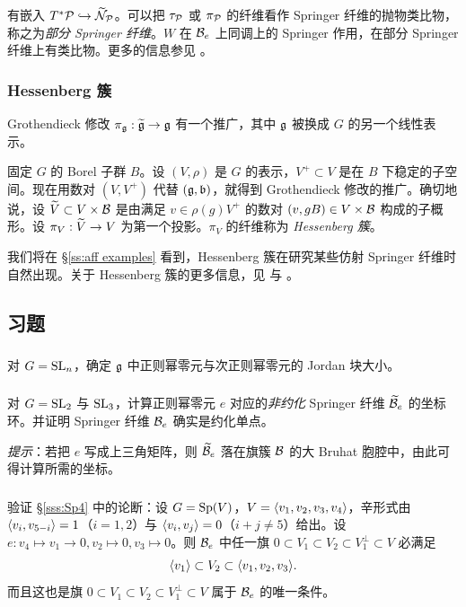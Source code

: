 有嵌入 $T^{*}\mathcal{P}\hookrightarrow \widetilde{\mathcal{N}}_{\mathcal{P}}$。可以把 $\tau_{\mathcal{P}}$ 或 $\pi_{\mathcal{P}}$ 的纤维看作 Springer 纤维的抛物类比物，称之为{\em 部分 Springer 纤维}。$W$ 在 $\mathcal{B}_{e}$ 上同调上的 Springer 作用，在部分 Springer 纤维上有类比物。更多的信息参见 \cite{BM}。

\subsubsection{Hessenberg 簇} Grothendieck 修改 $\pi_{\mathfrak{g}}:\widetilde{\mathfrak{g}}\to \mathfrak{g}$ 有一个推广，其中 $\mathfrak{g}$ 被换成 $G$ 的另一个线性表示。

固定 $G$ 的 Borel 子群 $B$。设 $(V,\rho)$ 是 $G$ 的表示，$V^{+}\subset V$ 是在 $B$ 下稳定的子空间。现在用数对 $(V,V^{+})$ 代替 $(\mathfrak{g},\mathfrak{b})$，就得到 Grothendieck 修改的推广。确切地说，设 $\widetilde{V}\subset V\times \mathcal{B}$ 是由满足 $v\in \rho(g)V^{+}$ 的数对 $(v, gB)\in V\times\mathcal{B}$ 构成的子概形。设 $\pi_{V}:\widetilde{V}\to V$ 为第一个投影。$\pi_{V}$ 的纤维称为 {\em Hessenberg 簇}。

我们将在 \S\ref{ss:aff examples} 看到，Hessenberg 簇在研究某些仿射 Springer 纤维时自然出现。关于 Hessenberg 簇的更多信息，见 \cite{GKM} 与 \cite{OY}。

\subsection{习题}

\subsubsection{} 对 $G=\textup{SL}_{n}$，确定 $\mathfrak{g}$ 中正则幂零元与次正则幂零元的 Jordan 块大小。

\subsubsection{}\label{exI:nonred Spr} 对 $G=\textup{SL}_{2}$ 与 $\textup{SL}_{3}$，计算正则幂零元 $e$ 对应的{\em 非约化} Springer 纤维 $\widetilde{\mathcal{B}}_{e}$ 的坐标环。并证明 Springer 纤维 $\mathcal{B}_{e}$ 确实是约化单点。

{\em 提示}：若把 $e$ 写成上三角矩阵，则 $\widetilde{\mathcal{B}}_{e}$ 落在旗簇 $\mathcal{B}$ 的大 Bruhat 胞腔中，由此可得计算所需的坐标。

\subsubsection{}\label{exI:211Sp4} 验证 \S\ref{sss:Sp4} 中的论断：设 $G=\textup{Sp}(V)$，$V=\langle{v_{1},v_{2},v_{3},v_{4}}\rangle$，辛形式由 $\langle{v_{i},v_{5-i}}\rangle=1$（$i=1,2$）与 $\langle{v_{i},v_{j}}\rangle=0$（$i+j\neq 5$）给出。设 $e: v_{4}\mapsto v_{1}\to 0, v_{2}\mapsto 0,v_{3}\mapsto 0$。则 $\mathcal{B}_{e}$ 中任一旗 $0\subset V_{1}\subset V_{2}\subset V_{1}^{\bot}\subset V$ 必满足
\begin{equation*}
\langle{v_{1}}\rangle\subset V_{2}\subset\langle{v_{1},v_{2},v_{3}}\rangle.
\end{equation*}
而且这也是旗 $0\subset V_{1}\subset V_{2}\subset V_{1}^{\bot}\subset V$ 属于 $\mathcal{B}_{e}$ 的唯一条件。


